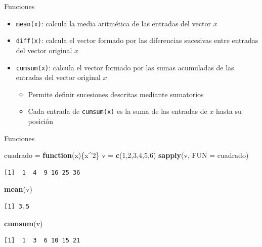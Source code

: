\documentclass[
  ignorenonframetext,
  aspectratio=169]{beamer}
\newenvironment{Shaded}{\begin{snugshade}}{\end{snugshade}}
\newcommand{\AttributeTok}[1]{\textcolor[rgb]{0.13,0.29,0.53}{#1}}
\newcommand{\ControlFlowTok}[1]{\textcolor[rgb]{0.13,0.29,0.53}{\textbf{#1}}}
\newcommand{\DecValTok}[1]{\textcolor[rgb]{0.00,0.00,0.81}{#1}}
\newcommand{\FunctionTok}[1]{\textcolor[rgb]{0.13,0.29,0.53}{\textbf{#1}}}
\newcommand{\NormalTok}[1]{#1}
\newcommand{\OtherTok}[1]{\textcolor[rgb]{0.56,0.35,0.01}{#1}}
\newcommand{\SpecialCharTok}[1]{\textcolor[rgb]{0.81,0.36,0.00}{\textbf{#1}}}
\providecommand{\tightlist}{%
  \setlength{\itemsep}{0pt}\setlength{\parskip}{0pt}}
\begin{document}
\begin{frame}[fragile]{Funciones}
\label{funciones-2}
\begin{itemize}
\tightlist
\item
  \texttt{mean(x)}: calcula la media aritmética de las entradas del
  vector \(x\)
\item
  \texttt{diff(x)}: calcula el vector formado por las diferencias
  sucesivas entre entradas del vector original \(x\)
\item
  \texttt{cumsum(x)}: calcula el vector formado por las sumas acumuladas
  de las entradas del vector original \(x\)

  \begin{itemize}
  \tightlist
  \item
    Permite definir sucesiones descritas mediante sumatorios
  \item
    Cada entrada de \texttt{cumsum(x)} es la suma de las entradas de
    \(x\) hasta su posición
  \end{itemize}
\end{itemize}
\end{frame}

\begin{frame}[fragile]{Funciones}
\label{funciones-3}
\begin{Shaded}
\begin{Highlighting}[]
\NormalTok{cuadrado }\OtherTok{=} \ControlFlowTok{function}\NormalTok{(x)\{x}\SpecialCharTok{\^{}}\DecValTok{2}\NormalTok{\}}
\NormalTok{v }\OtherTok{=} \FunctionTok{c}\NormalTok{(}\DecValTok{1}\NormalTok{,}\DecValTok{2}\NormalTok{,}\DecValTok{3}\NormalTok{,}\DecValTok{4}\NormalTok{,}\DecValTok{5}\NormalTok{,}\DecValTok{6}\NormalTok{)}
\FunctionTok{sapply}\NormalTok{(v, }\AttributeTok{FUN =}\NormalTok{ cuadrado)}
\end{Highlighting}
\end{Shaded}

\begin{verbatim}
[1]  1  4  9 16 25 36
\end{verbatim}

\begin{Shaded}
\begin{Highlighting}[]
\FunctionTok{mean}\NormalTok{(v)}
\end{Highlighting}
\end{Shaded}

\begin{verbatim}
[1] 3.5
\end{verbatim}

\begin{Shaded}
\begin{Highlighting}[]
\FunctionTok{cumsum}\NormalTok{(v)}
\end{Highlighting}
\end{Shaded}

\begin{verbatim}
[1]  1  3  6 10 15 21
\end{verbatim}
\end{frame}
\end{document}
